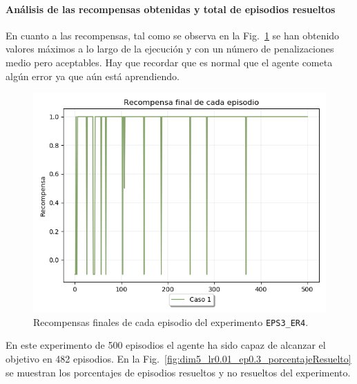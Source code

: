 \paragraph{Análisis de las recompensas obtenidas y total de episodios resueltos} 

En cuanto a las recompensas, tal como se observa en la Fig.~\ref{fig:dim5_lr0.01_ep0.3_recompensa} se han obtenido valores máximos a lo largo de la ejecución y con un número de penalizaciones medio pero aceptables. Hay que recordar que es normal que el agente cometa algún error ya que aún está aprendiendo. \\

\begin{figure}
    \centering
    \includegraphics[scale=0.4]{cap5_experimentacion/images/dim5_lr0.01_ep0.3_recompensa.png}
    \caption{Recompensas finales de cada episodio del experimento \texttt{EPS3\_ER4}.}
    \label{fig:dim5_lr0.01_ep0.3_recompensa}
\end{figure}

En este experimento de 500 episodios el agente ha sido capaz de alcanzar el objetivo en 482 episodios. En la Fig.~\ref{fig:dim5_lr0.01_ep0.3_porcentajeResuelto} se muestran los porcentajes de episodios resueltos y no resueltos del experimento.

